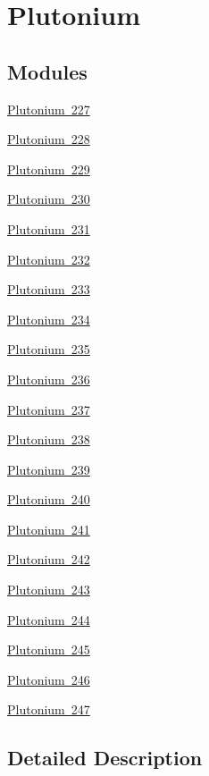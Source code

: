 \hypertarget{group___isotope_const-_plutonium}{}\section{Plutonium}
\label{group___isotope_const-_plutonium}
\subsection*{Modules}
\begin{DoxyCompactItemize}
\item 
\mbox{\hyperlink{group___isotope_const-_plutonium-_pu227}{Plutonium 227}}
\item 
\mbox{\hyperlink{group___isotope_const-_plutonium-_pu228}{Plutonium 228}}
\item 
\mbox{\hyperlink{group___isotope_const-_plutonium-_pu229}{Plutonium 229}}
\item 
\mbox{\hyperlink{group___isotope_const-_plutonium-_pu230}{Plutonium 230}}
\item 
\mbox{\hyperlink{group___isotope_const-_plutonium-_pu231}{Plutonium 231}}
\item 
\mbox{\hyperlink{group___isotope_const-_plutonium-_pu232}{Plutonium 232}}
\item 
\mbox{\hyperlink{group___isotope_const-_plutonium-_pu233}{Plutonium 233}}
\item 
\mbox{\hyperlink{group___isotope_const-_plutonium-_pu234}{Plutonium 234}}
\item 
\mbox{\hyperlink{group___isotope_const-_plutonium-_pu235}{Plutonium 235}}
\item 
\mbox{\hyperlink{group___isotope_const-_plutonium-_pu236}{Plutonium 236}}
\item 
\mbox{\hyperlink{group___isotope_const-_plutonium-_pu237}{Plutonium 237}}
\item 
\mbox{\hyperlink{group___isotope_const-_plutonium-_pu238}{Plutonium 238}}
\item 
\mbox{\hyperlink{group___isotope_const-_plutonium-_pu239}{Plutonium 239}}
\item 
\mbox{\hyperlink{group___isotope_const-_plutonium-_pu240}{Plutonium 240}}
\item 
\mbox{\hyperlink{group___isotope_const-_plutonium-_pu241}{Plutonium 241}}
\item 
\mbox{\hyperlink{group___isotope_const-_plutonium-_pu242}{Plutonium 242}}
\item 
\mbox{\hyperlink{group___isotope_const-_plutonium-_pu243}{Plutonium 243}}
\item 
\mbox{\hyperlink{group___isotope_const-_plutonium-_pu244}{Plutonium 244}}
\item 
\mbox{\hyperlink{group___isotope_const-_plutonium-_pu245}{Plutonium 245}}
\item 
\mbox{\hyperlink{group___isotope_const-_plutonium-_pu246}{Plutonium 246}}
\item 
\mbox{\hyperlink{group___isotope_const-_plutonium-_pu247}{Plutonium 247}}
\end{DoxyCompactItemize}


\subsection{Detailed Description}
